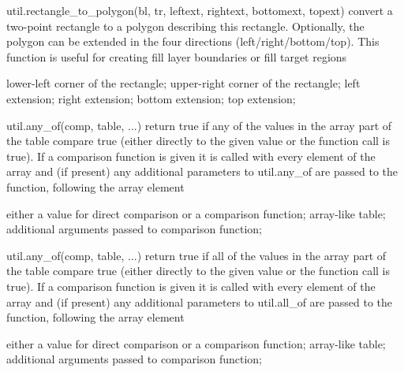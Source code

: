 \begin{APIfunc}{util.rectangle\_to\_polygon(bl, tr, leftext, rightext, bottomext, topext)}
    convert a two-point rectangle to a polygon describing this rectangle. Optionally, the polygon can be extended in the four directions (left/right/bottom/top). This function is useful for creating fill layer boundaries or fill target regions
    \begin{APIparameters}
            lower-left corner of the rectangle;
            upper-right corner of the rectangle;
            left extension;
            right extension;
            bottom extension;
            top extension;
    \end{APIparameters}
\end{APIfunc}
\begin{APIfunc}{util.any\_of(comp, table, ...)}
    return true if any of the values in the array part of the table compare true (either directly to the given value or the function call is true). If a comparison function is given it is called with every element of the array and (if present) any additional parameters to util.any\_of are passed to the function, following the array element
    \begin{APIparameters}
            either a value for direct comparison or a comparison function;
            array-like table;
            additional arguments passed to comparison function;
    \end{APIparameters}
\end{APIfunc}
\begin{APIfunc}{util.any\_of(comp, table, ...)}
    return true if all of the values in the array part of the table compare true (either directly to the given value or the function call is true). If a comparison function is given it is called with every element of the array and (if present) any additional parameters to util.all\_of are passed to the function, following the array element
    \begin{APIparameters}
            either a value for direct comparison or a comparison function;
            array-like table;
            additional arguments passed to comparison function;
    \end{APIparameters}
\end{APIfunc}
